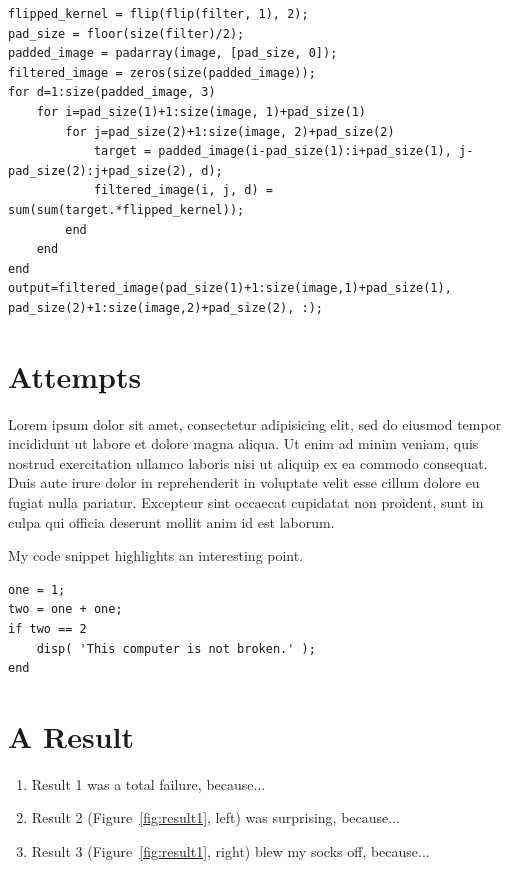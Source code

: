 \begin{lstlisting}[style=Matlab-editor]
flipped_kernel = flip(flip(filter, 1), 2);
pad_size = floor(size(filter)/2);
padded_image = padarray(image, [pad_size, 0]);
filtered_image = zeros(size(padded_image));
for d=1:size(padded_image, 3)
    for i=pad_size(1)+1:size(image, 1)+pad_size(1)
        for j=pad_size(2)+1:size(image, 2)+pad_size(2)
            target = padded_image(i-pad_size(1):i+pad_size(1), j-pad_size(2):j+pad_size(2), d);
            filtered_image(i, j, d) = sum(sum(target.*flipped_kernel));
        end
    end
end
output=filtered_image(pad_size(1)+1:size(image,1)+pad_size(1), pad_size(2)+1:size(image,2)+pad_size(2), :);

\end{lstlisting}

\section*{Attempts}

Lorem ipsum dolor sit amet, consectetur adipisicing elit, sed do eiusmod tempor incididunt ut labore et dolore magna aliqua. Ut enim ad minim veniam, quis nostrud exercitation ullamco laboris nisi ut aliquip ex ea commodo consequat. Duis aute irure dolor in reprehenderit in voluptate velit esse cillum dolore eu fugiat nulla pariatur. Excepteur sint occaecat cupidatat non proident, sunt in culpa qui officia deserunt mollit anim id est laborum.

My code snippet highlights an interesting point.
\begin{lstlisting}[style=Matlab-editor]
one = 1;
two = one + one;
if two == 2
    disp( 'This computer is not broken.' );
end
\end{lstlisting}

\section*{A Result}

\begin{enumerate}
    \item Result 1 was a total failure, because...
    \item Result 2 (Figure~\ref{fig:result1}, left) was surprising, because...
    \item Result 3 (Figure~\ref{fig:result1}, right) blew my socks off, because...
\end{enumerate}

